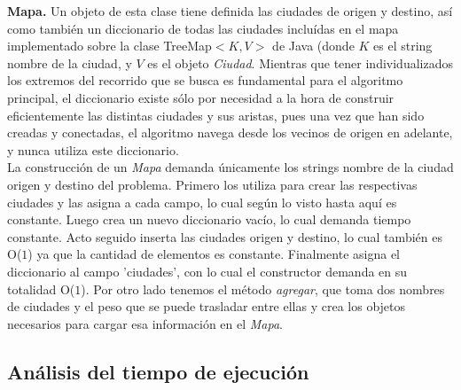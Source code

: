\indent \textbf{Mapa.} Un objeto de esta clase tiene definida las ciudades de origen y destino, así como también un diccionario de todas las ciudades incluídas en el mapa implementado sobre la clase TreeMap$<K,V>$ de Java (donde $K$ es el string nombre de la ciudad, y $V$ es el objeto \textsl{Ciudad}. Mientras que tener individualizados los extremos del recorrido que se busca es fundamental para el algoritmo principal, el diccionario existe sólo por necesidad a la hora de construir eficientemente las distintas ciudades y sus aristas, pues una vez que han sido creadas y conectadas, el algoritmo navega desde los vecinos de origen en adelante, y nunca utiliza este diccionario.\\
\indent La construcción de un \textsl{Mapa} demanda únicamente los strings nombre de la ciudad origen y destino del problema. Primero los utiliza para crear las respectivas ciudades y las asigna a cada campo, lo cual según lo visto hasta aquí es constante. Luego crea un nuevo diccionario vacío, lo cual demanda tiempo constante. Acto seguido inserta las ciudades origen y destino, lo cual también es O($1$) ya que la cantidad de elementos es constante. Finalmente asigna el diccionario al campo 'ciudades', con lo cual el constructor demanda en su totalidad O($1$). Por otro lado tenemos el método \textsl{agregar}, que toma dos nombres de ciudades y el peso que se puede trasladar entre ellas y crea los objetos necesarios para cargar esa información en el \textsl{Mapa}.


\subsection{Análisis del tiempo de ejecución}












